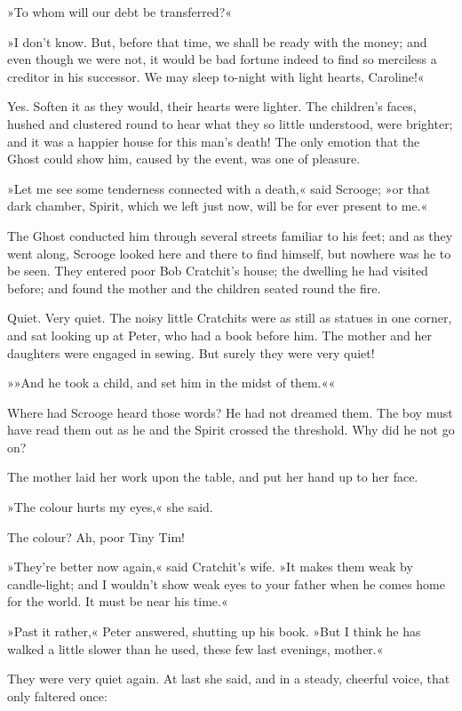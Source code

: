 »To whom will our debt be transferred?«

»I don't know. But, before that time, we shall be ready with the money; and even though we were not, it would be bad fortune indeed to find so merciless a creditor in his successor. We may sleep to-night with light hearts, Caroline!«

Yes. Soften it as they would, their hearts were lighter. The children's faces, hushed and clustered round to hear what they so little understood, were brighter; and it was a happier house for this man's death! The only emotion that the Ghost could show him, caused by the event, was one of pleasure.

»Let me see some tenderness connected with a death,« said Scrooge; »or that dark chamber, Spirit, which we left just now, will be for ever present to me.«

The Ghost conducted him through several streets familiar to his feet; and as they went along, Scrooge looked here and there to find himself, but nowhere was he to be seen. They entered poor Bob Cratchit's house; the dwelling he had visited before; and found the mother and the children seated round the fire.

Quiet. Very quiet. The noisy little Cratchits were as still as statues in one corner, and sat looking up at Peter, who had a book before him. The mother and her daughters were engaged in sewing. But surely they were very quiet!

»»And he took a child, and set him in the midst of them.««

Where had Scrooge heard those words? He had not dreamed them. The boy must have read them out as he and the Spirit crossed the threshold. Why did he not go on?

The mother laid her work upon the table, and put her hand up to her face.

»The colour hurts my eyes,« she said.

The colour? Ah, poor Tiny Tim!

»They're better now again,« said Cratchit's wife. »It makes them weak by candle-light; and I wouldn't show weak eyes to your father when he comes home for the world. It must be near his time.«

»Past it rather,« Peter answered, shutting up his book. »But I think he has walked a little slower than he used, these few last evenings, mother.«

They were very quiet again. At last she said, and in a steady, cheerful voice, that only faltered once:

